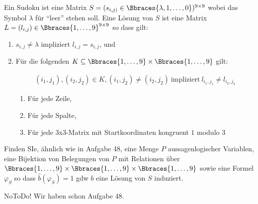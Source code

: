 
\begin{exercise}[49]

Ein Sudoku ist eine Matrix $S = (s_{i, j)} \in \Bbraces{\lambda, 1, \dots, 0})^{9 \times 9}$ wobei das Symbol $\lambda$ für \enquote{leer} stehen soll.
Eine Lösung von $S$ ist eine Matrix $L = (l_{i, j}) \in \Bbraces{1, \dots, 9}^{9 \times 9}$ so dass gilt:

\begin{enumerate}[label = \arabic*.]

    \item $s_{i, j} \neq \lambda$ impliziert $l_{i, j} = s_{i, j}$, und
    
    \item Für die folgenden $K \subseteq \Bbraces{1, \dots, 9} \times \Bbraces{1, \dots, 9}$ gilt:
    
    \begin{align*}
        (i_1, j_1), (i_2, j_2) \in K,
        (i_1, j_2) \neq (i_2, j_2)
        ~\text{impliziert}~
        l_{i_1, j_1} \neq l_{i_2, j_2}
    \end{align*}

    \begin{enumerate}
        \item Für jede Zeile,
        \item Für jede Spalte,
        \item Für jede 3x3-Matrix mit Startkoordinaten kongruent $1$ modulo $3$
    \end{enumerate}

\end{enumerate}

Finden SIe, ähnlich wie in Aufgabe 48, eine Menge $P$ aussagenlogischer Variablen, eine Bijektion von Belegungen von $P$ mit Relationen über $\Bbraces{1, \dots, 9} \times \Bbraces{1, \dots, 9} \times \Bbraces{1, \dots, 9}$ sowie eine Formel $\varphi_S$ so dass $\hat{b}(\varphi_S) = 1$ gdw $b$ eine Lösung von $S$ induziert.

\end{exercise}


\begin{solution}

NoToDo!
Wir haben schon Aufgabe 48.

\end{solution}

